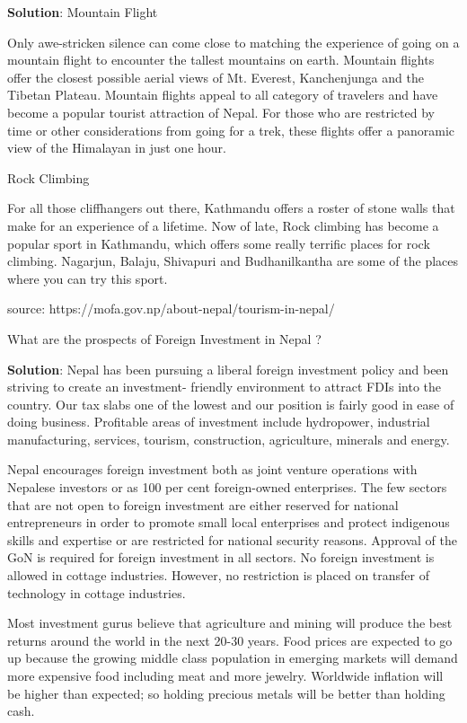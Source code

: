 \documentclass[
]{book}
\newcommand{\question}{\item}
\newenvironment{solution}{ {\bfseries Solution}:}{}
\begin{document}
\begin{questions}
\begin{solution}
Mountain Flight

Only awe-stricken silence can come close to matching the experience of going on a mountain flight to encounter the tallest mountains on earth. Mountain flights offer the closest possible aerial views of Mt. Everest, Kanchenjunga and the Tibetan Plateau. Mountain flights appeal to all category of travelers and have become a popular tourist attraction of Nepal. For those who are restricted by time or other considerations from going for a trek, these flights offer a panoramic view of the Himalayan in just one hour.

Rock Climbing

For all those cliffhangers out there, Kathmandu offers a roster of stone walls that make for an experience of a lifetime. Now of late, Rock climbing has become a popular sport in Kathmandu, which offers some really terrific places for rock climbing. Nagarjun, Balaju, Shivapuri and Budhanilkantha are some of the places where you can try this sport.

source: https://mofa.gov.np/about-nepal/tourism-in-nepal/
\end{solution}

\question What are the prospects of Foreign Investment in Nepal ?

\begin{solution}
Nepal has been pursuing a liberal foreign investment policy and been striving to create an investment- friendly environment to attract FDIs into the country. Our tax slabs one of the lowest and our position is fairly good in ease of doing business. Profitable areas of investment include hydropower, industrial manufacturing, services, tourism, construction, agriculture, minerals and energy.

Nepal encourages foreign investment both as joint venture operations with Nepalese investors or as 100 per cent foreign-owned enterprises. The few sectors that are not open to foreign investment are either reserved for national entrepreneurs in order to promote small local enterprises and protect indigenous skills and expertise or are restricted for national security reasons. Approval of the GoN is required for foreign investment in all sectors. No foreign investment is allowed in cottage industries. However, no restriction is placed on transfer of technology in cottage industries.

Most investment gurus believe that agriculture and mining will produce the best returns around the world in the next 20-30 years. Food prices are expected to go up because the growing middle class population in emerging markets will demand more expensive food including meat and more jewelry. Worldwide inflation will be higher than expected; so holding precious metals will be better than holding cash.


\end{solution}
\end{questions}
\end{document}
